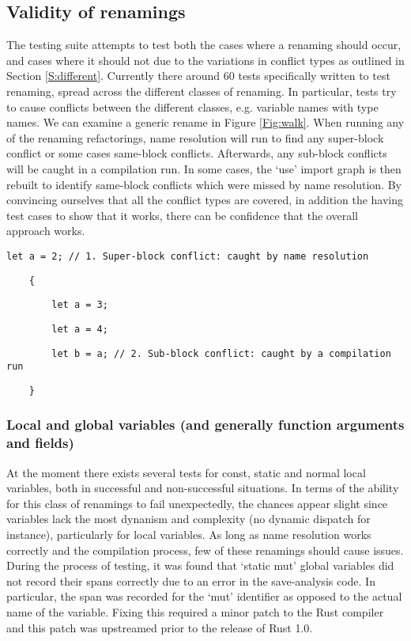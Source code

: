 \subsection{Validity of renamings}
The testing suite attempts to test both the cases where a renaming should occur, and cases where it should not due to the variations in conflict types as outlined in Section \ref{S:different}. Currently there around 60 tests specifically written to test renaming, spread across the different classes of renaming. In particular, tests try to cause conflicts between the different classes, e.g. variable names with type names. We can examine a generic rename in Figure \ref{Fig:walk}. When running any of the renaming refactorings, name resolution will run to find any super-block conflict or some cases same-block conflicts. Afterwards, any sub-block conflicts will be caught in a compilation run. In some cases, the `use' import graph is then rebuilt to identify same-block conflicts which were missed by name resolution. By convincing ourselves that all the conflict types are covered, in addition the having test cases to show that it works, there can be confidence that the overall approach works.

\begin{fig}
{\verb|let a = 2; // 1. Super-block conflict: caught by name resolution|}

{\verb|    {|}

{\verb|        let |}{\color{red}\verb|a|}{\verb| = 3;|}

{\verb|        let a = 4;|}

{\verb|        let b = |}{\color{red}\verb|a|}{\verb|; // 2. Sub-block conflict: caught by a compilation run|}

{\verb|    }|}
\caption{Examining a tentative rename in red}
\label{Fig:walk}
\end{fig}

\subsubsection{Local and global variables (and generally function arguments and fields)}
At the moment there exists several tests for const, static and normal local variables, both in successful and non-successful situations. In terms of the ability for this class of renamings to fail unexpectedly, the chances appear slight since variables lack the most dynanism and complexity (no dynamic dispatch for instance), particularly for local variables. As long as name resolution works correctly and the compilation process, few of these renamings should cause issues. During the process of testing, it was found that `static mut' global variables did not record their spans correctly due to an error in the save-analysis code. In particular, the span was recorded for the `mut' identifier as opposed to the actual name of the variable. Fixing this required a minor patch to the Rust compiler and this patch was upstreamed prior to the release of Rust 1.0.

